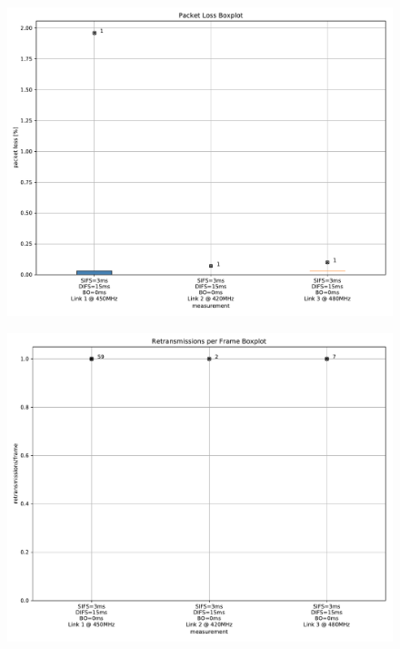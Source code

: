 \documentclass{article}
\begin{document}
\begin{figure}
	\includegraphics[width=\textwidth]{no_bo_single/boxplot/packet_loss_boxplot}
\end{figure}

\begin{figure}
	\includegraphics[width=\textwidth]{no_bo_single/boxplot/retransmissions_per_frame_boxplot}
\end{figure}
\end{document}
